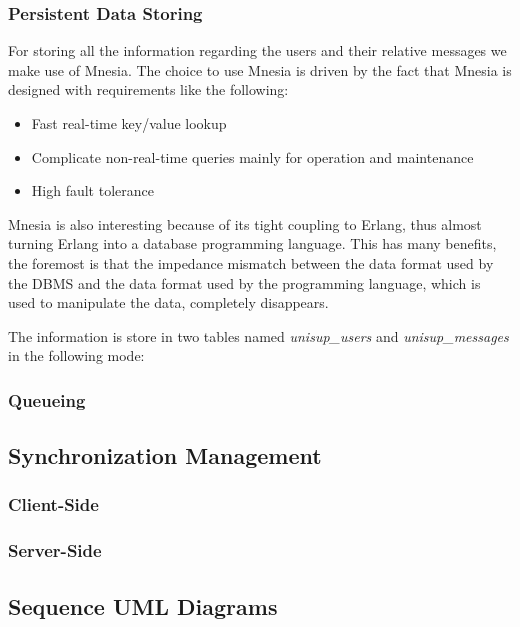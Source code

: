\subsubsection{Persistent Data Storing}
For storing all the information regarding the users and their relative messages we make use of Mnesia. The choice to use Mnesia is driven by the fact that Mnesia is designed with requirements like the following:
\begin{itemize}
	\item Fast real-time key/value lookup
	\item Complicate non-real-time queries mainly for operation and maintenance
	\item High fault tolerance
\end{itemize}
Mnesia is also interesting because of its tight coupling to Erlang, thus almost turning Erlang into a database programming language. This has many benefits, the foremost is that the impedance mismatch between the data format used by the DBMS and the data format used by the programming language, which is used to manipulate the data, completely disappears.

The information is store in two tables named \textit{unisup\_users} and \textit{unisup\_messages} in the following mode:


\subsubsection{Queueing}

\subsection{Synchronization Management}
\subsubsection{Client-Side}
\subsubsection{Server-Side}

\subsection{Sequence UML Diagrams}